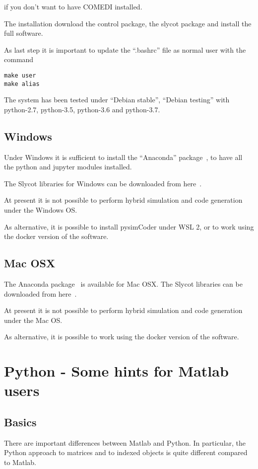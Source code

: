if you don't want to have COMEDI installed.

The installation download the control package, the slycot package 
and install the full software.

As last step it is important to update the ``.bashrc'' file as normal user with the command

\begin{verbatim}
make user
make alias
\end{verbatim}

The system has been tested under ``Debian stable'', ``Debian testing'' with 
python-2.7, python-3.5, python-3.6 and python-3.7.

\section{Windows}

Under Windows it is sufficient to install the ``Anaconda'' 
package~\cite{ANACONDA}, to have all the python and jupyter modules installed.

The Slycot libraries for Windows can be downloaded from here~\cite{SLYCOT2}.

At present it is not possible to perform hybrid simulation and code generation under the Windows OS.

As alternative, it is possible to install pysimCoder under WSL 2, or to work using the docker version of the software.

\section{Mac OSX}

The Anaconda package~\cite{ANACONDA} is available for Mac OSX. The Slycot 
libraries can be downloaded from here~\cite{SLYCOT2}.

At present it is not possible to perform hybrid simulation and code generation under the Mac OS.

As alternative, it is possible to work using the docker version of the software.

\chapter{Python - Some hints for Matlab users}

\section{Basics}
There are important differences between Matlab and Python.
In particular, the Python approach to matrices and to indexed objects is 
quite different compared to Matlab.

